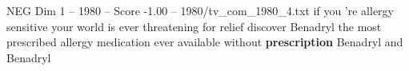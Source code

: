 \begin{textsample}{NEG Dim 1 – 1980 – Score -1.00 – 1980/tv\_com\_1980\_4.txt}  \label{ex:f1_neg_057}
if you 're allergy sensitive your world is ever threatening for relief discover Benadryl the most prescribed allergy medication ever available without \textbf{prescription} Benadryl and Benadryl

\end{textsample}
